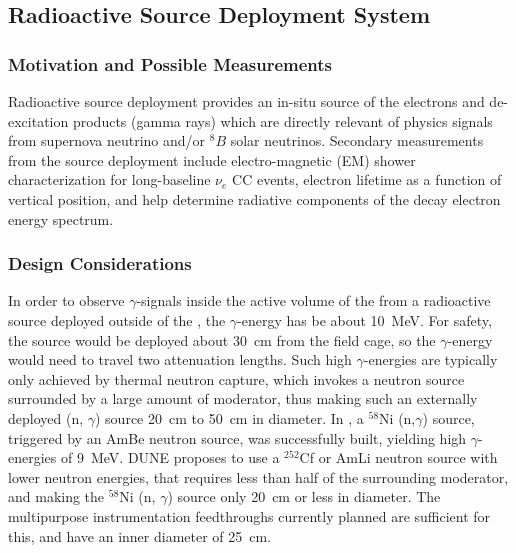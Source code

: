 \subsection{Radioactive Source Deployment System}
\label{sec:rs}

\subsubsection{Motivation and Possible Measurements}

Radioactive source deployment provides an in-situ source of the electrons and de-excitation products (gamma rays) which are directly relevant of physics signals from supernova neutrino and/or $^{8}B$ solar neutrinos. Secondary measurements from the source deployment include electro-magnetic (EM) shower characterization for long-baseline $\nu_e$ CC events, electron lifetime as a function of %
 vertical position, and help determine radiative components of the decay electron energy spectrum.

\subsubsection{Design Considerations} 

In order to %
observe $\gamma$-signals inside the active volume of the  from a radioactive source deployed outside of the , the $\gamma$-energy has be about \SI{10}{\MeV}. For safety, the source would be deployed about \SI{30}{\cm} from the field cage, so the  $\gamma$-energy would need to travel two attenuation lengths. Such high $\gamma$-energies are typically only achieved by thermal neutron capture, which invokes a neutron source surrounded by a large amount of moderator, thus making such an externally deployed (n, $\gamma$) source \SI{20}{\cm}  to \SI{50}{\cm} %
in diameter. In \cite{bib:Triumf:Nickelsource}, a $^{58}$Ni (n,$\gamma$) source, triggered by an AmBe neutron source, was successfully built, yielding high $\gamma$-energies of \SI{9}{\MeV}. DUNE %
proposes to use a $^{252}$Cf or AmLi neutron source with lower neutron energies, that requires less than half of the surrounding moderator, and making the $^{58}$Ni (n, $\gamma$) source only \SI{20}{\cm} or less in diameter. The multipurpose instrumentation feedthroughs currently planned are sufficient for this, and have an inner diameter of \SI{25}{\cm}.

